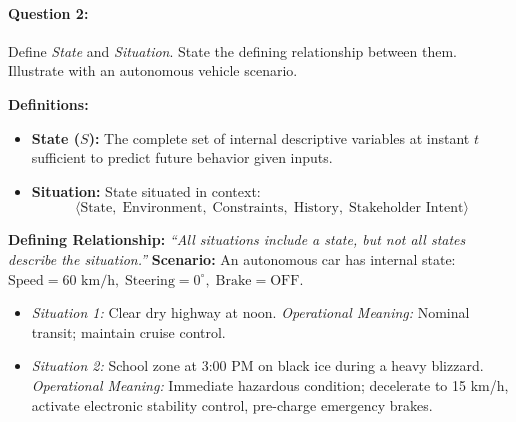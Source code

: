 \paragraph{Question 2:} Define \textit{State} and \textit{Situation}. State the defining relationship between them. Illustrate with an autonomous vehicle scenario.
\vspace{0.3em}
\begin{tcolorbox}[colback=white,colframe=seSecondary,title={\small \textbf{Model Solution to Question 2:}}]
\textbf{Definitions:}
\begin{itemize}[leftmargin=1.5em]
    \item \textbf{State ($S$):} The complete set of internal descriptive variables at instant $t$ sufficient to predict future behavior given inputs.
    \item \textbf{Situation:} State situated in context:
    \[
        \langle \text{State}, \; \text{Environment}, \; \text{Constraints}, \; \text{History}, \; \text{Stakeholder Intent} \rangle
    \]
\end{itemize}
\textbf{Defining Relationship:} \textit{``All situations include a state, but not all states describe the situation.''}
\textbf{Scenario:} An autonomous car has internal state: $\text{Speed} = 60\text{ km/h}, \; \text{Steering} = 0^\circ, \; \text{Brake} = \text{OFF}$.
\begin{itemize}[leftmargin=1.5em]
    \item \textit{Situation 1:} Clear dry highway at noon. \textit{Operational Meaning:} Nominal transit; maintain cruise control.
    \item \textit{Situation 2:} School zone at 3:00 PM on black ice during a heavy blizzard. \textit{Operational Meaning:} Immediate hazardous condition; decelerate to 15 km/h, activate electronic stability control, pre-charge emergency brakes.
\end{itemize}
\end{tcolorbox}

